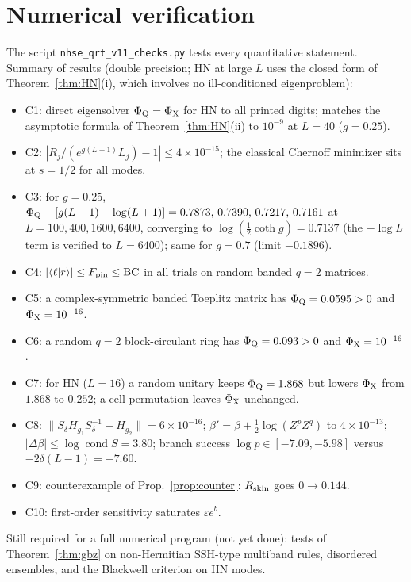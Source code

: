 \documentclass[11pt]{article}
\newcommand{\Rskin}{R_{\rm skin}}
\newcommand{\PhiQ}{\Phi_{\rm Q}}
\newcommand{\PhiX}{\Phi_{\rm X}}
\newcommand{\BC}{\mathrm{BC}}
\newcommand{\cond}{\operatorname{cond}}
\newcommand{\ip}[2]{\langle #1|#2\rangle}
\begin{document}
\section{Numerical verification}\label{sec:num}
The script \texttt{nhse\_qrt\_v11\_checks.py} tests every quantitative statement. Summary of results (double precision; HN at large $L$ uses the closed form of Theorem~\ref{thm:HN}(i), which involves no ill-conditioned eigenproblem):
\begin{itemize}
\item C1: direct eigensolver $\PhiQ=\PhiX$ for HN to all printed digits; matches the asymptotic formula of Theorem~\ref{thm:HN}(ii) to $10^{-9}$ at $L=40$ ($g=0.25$).
\item C2: $|R_j/(e^{g(L-1)}L_j)-1|\le4\times10^{-15}$; the classical Chernoff minimizer sits at $s=1/2$ for all modes.
\item C3: for $g=0.25$, $\PhiQ-[g(L-1)-\log(L+1)]=0.7873,\,0.7390,\,0.7217,\,0.7161$ at $L=100,400,1600,6400$, converging to $\log(\tfrac12\coth g)=0.7137$ (the $-\log L$ term is verified to $L=6400$); same for $g=0.7$ (limit $-0.1896$).
\item C4: $|\ip\ell r|\le F_{\rm pin}\le\BC$ in all trials on random banded $q=2$ matrices.
\item C5: a complex-symmetric banded Toeplitz matrix has $\PhiQ=0.0595>0$ and $\PhiX=10^{-16}$.
\item C6: a random $q=2$ block-circulant ring has $\PhiQ=0.093>0$ and $\PhiX=10^{-16}$.
\item C7: for HN ($L=16$) a random unitary keeps $\PhiQ=1.868$ but lowers $\PhiX$ from $1.868$ to $0.252$; a cell permutation leaves $\PhiX$ unchanged.
\item C8: $\|S_\delta H_{g_1}S_\delta^{-1}-H_{g_2}\|=6\times10^{-16}$; $\beta'=\beta+\tfrac12\log(Z^pZ^q)$ to $4\times10^{-13}$; $|\Delta\beta|\le\log\cond S=3.80$; branch success $\log p\in[-7.09,-5.98]$ versus $-2\delta(L-1)=-7.60$.
\item C9: counterexample of Prop.~\ref{prop:counter}: $\Rskin$ goes $0\to0.144$.
\item C10: first-order sensitivity saturates $\varepsilon e^{b}$.
\end{itemize}
Still required for a full numerical program (not yet done): tests of Theorem~\ref{thm:gbz} on non-Hermitian SSH-type multiband rules, disordered ensembles, and the Blackwell criterion on HN modes.

\end{document}
